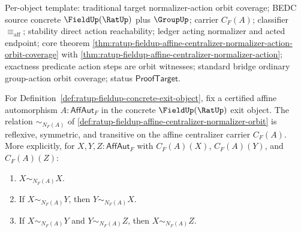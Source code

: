 Per-object template: traditional target normalizer-action orbit coverage; BEDC
source concrete $\FieldUp(\RatUp)$ plus $\GroupUp$; carrier $C_F(A)$;
classifier $\equiv_{\mathrm{aff}}$; stability direct action reachability;
ledger acting normalizer and acted endpoint; core theorem
\autoref{thm:ratup-fieldup-affine-centralizer-normalizer-action-orbit-coverage}
with
\autoref{thm:ratup-fieldup-affine-centralizer-normalizer-action}; exactness
predicate action steps are orbit witnesses; standard bridge ordinary
group-action orbit coverage; status $\mathsf{ProofTarget}$.

\begin{theorem}
\label{thm:ratup-fieldup-affine-centralizer-normalizer-orbit-equivalence}
For Definition~\ref{def:ratup-fieldup-concrete-exit-object}, fix a certified
affine automorphism $A:\mathsf{AffAut}_F$ in the concrete $\FieldUp(\RatUp)$
exit object. The relation
$\sim_{N_F(A)}$ of
\autoref{def:ratup-fieldup-affine-centralizer-normalizer-orbit} is reflexive,
symmetric, and transitive on the affine centralizer carrier $C_F(A)$. More
explicitly, for $X,Y,Z:\mathsf{AffAut}_F$ with $C_F(A)(X)$, $C_F(A)(Y)$, and
$C_F(A)(Z)$:
\begin{enumerate}
\item $X\sim_{N_F(A)}X$.
\item If $X\sim_{N_F(A)}Y$, then $Y\sim_{N_F(A)}X$.
\item If $X\sim_{N_F(A)}Y$ and $Y\sim_{N_F(A)}Z$, then
$X\sim_{N_F(A)}Z$.
\end{enumerate}
\end{theorem}
